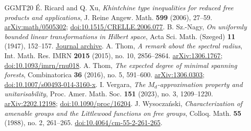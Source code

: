 \documentclass[a4paper,11pt]{amsproc}
\numberwithin{equation}{section}
\theoremstyle{definition}
\begin{document}
\begin{thebibliography}{GGMT20}
 \'{E}. Ricard and Q. Xu, \emph{Khintchine type inequalities for reduced free products and applications}, J. Reine Angew. Math. \textbf{599} (2006), 27--59. \href{https://arxiv.org/abs/math/0505302}{arXiv:math/0505302}; \href{https://doi.org/10.1515/CRELLE.2006.077}{doi:10.1515/CRELLE.2006.077}.
 B. Sz.-Nagy, \emph{On uniformly bounded linear transformations in Hilbert space}, Acta Sci. Math. (Szeged) \textbf{11} (1947), 152--157. \href{https://acta.bibl.u-szeged.hu/13563/}{Journal archive}.
 A. Thom, \emph{A remark about the spectral radius}, Int. Math. Res. IMRN \textbf{2015} (2015), no. 10, 2856--2864. \href{https://arxiv.org/abs/1306.1767}{arXiv:1306.1767}; \href{https://doi.org/10.1093/imrn/rnu018}{doi:10.1093/imrn/rnu018}.
 A. Thom, \emph{The expected degree of minimal spanning forests}, Combinatorica \textbf{36} (2016), no. 5, 591--600. \href{https://arxiv.org/abs/1306.0303}{arXiv:1306.0303}; \href{https://doi.org/10.1007/s00493-014-3160-x}{doi:10.1007/s00493-014-3160-x}.
 I. Vergara, \emph{The $M_d$-approximation property and unitarisability}, Proc. Amer. Math. Soc. \textbf{151} (2023), no. 3, 1209--1220. \href{https://arxiv.org/abs/2202.12198}{arXiv:2202.12198}; \href{https://doi.org/10.1090/proc/16204}{doi:10.1090/proc/16204}.
 J. Wysocza\'nski, \emph{Characterization of amenable groups and the Littlewood functions on free groups}, Colloq. Math. \textbf{55} (1988), no. 2, 261--265. \href{https://doi.org/10.4064/cm-55-2-261-265}{doi:10.4064/cm-55-2-261-265}.
\end{thebibliography}
\end{document}
